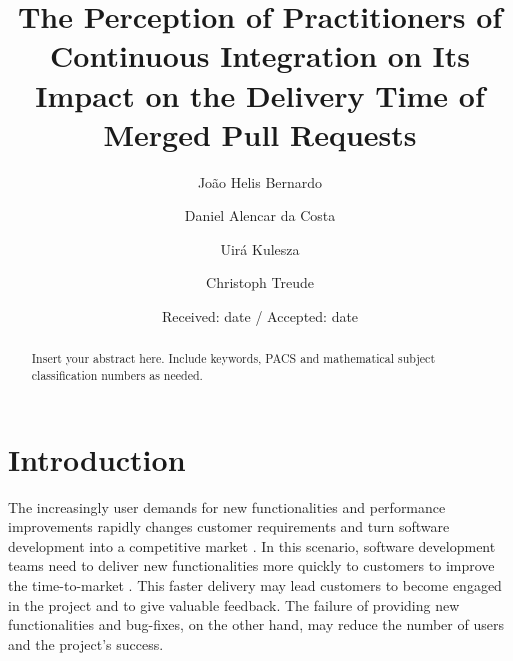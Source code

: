 	
	\title{
		The Perception of Practitioners of Continuous Integration on Its Impact on the Delivery Time of Merged Pull Requests
	}
	
	
	\author{João Helis Bernardo         \and
		Daniel Alencar da Costa \and 
		Uirá Kulesza \and 
		Christoph Treude \and 
	}
	
	
	
	\date{Received: date / Accepted: date}
	
	
	\maketitle
	
	\begin{abstract}
		Insert your abstract here. Include keywords, PACS and mathematical
		subject classification numbers as needed.
	\end{abstract}

	\section{Introduction}
	The increasingly user demands for new functionalities and performance
	improvements rapidly changes customer requirements and turn software development
	into a competitive market \cite{Wnuk2013-ju}. In this scenario, 
	software development teams need to deliver new functionalities more quickly to
	customers to improve the time-to-market \cite{Debbiche2014,
		Laukkanen2015-ab}. This faster delivery may lead customers to become engaged in
	the project and to give valuable feedback. The failure of providing new
	functionalities and bug-fixes, on the other hand, may reduce the number of users
	and the project's success.
	
